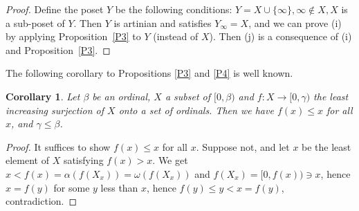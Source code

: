 \documentclass[12pt,letterpaper]{article}
\newtheorem{cor}[thm]{Corollary}
\begin{document}
\begin{proof}
Define the poset $Y$ be the following conditions: $Y=X\cup\{\infty\},\infty\notin X,X$ is a sub-poset of $Y$. Then $Y$ is artinian and satisfies $Y_\infty=X$, and we can prove (i) by applying Proposition~\ref{P3} to $Y$ (instead of $X$). Then (j) is a consequence of (i) and Proposition~\ref{P3}. 
\end{proof} 

The following corollary to Propositions \ref{P3} and \ref{P4} is well known. 

\begin{cor}
Let $\beta$ be an ordinal, $X$ a subset of $[0,\beta)$ and $f:X\to[0,\gamma)$ the least increasing surjection of $X$ onto a set of ordinals. Then we have $f(x)\le x$ for all $x$, and $\gamma\le\beta$. 
\end{cor} 

\begin{proof}
It suffices to show $f(x)\le x$ for all $x$. Suppose not, and let $x$ be the least element of $X$ satisfying $f(x)>x$. We get $x<f(x)=\alpha(f(X_x))=\omega(f(X_x))$ and $f(X_x)=[0,f(x))\ni x$, hence $x=f(y)$ for some $y$ less than $x$, hence $f(y)\le y<x=f(y)$, contradiction. 
\end{proof} 
\end{document}
